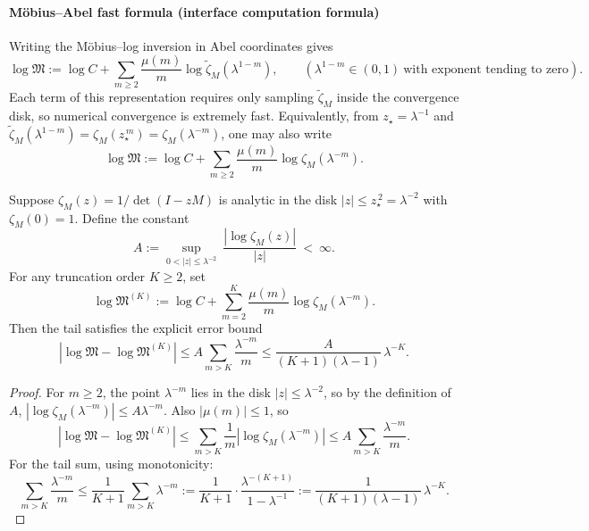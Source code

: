 \paragraph{M\"obius--Abel fast formula (interface computation formula)}
Writing the M\"obius--log inversion in Abel coordinates gives
\[
\log\mathfrak{M}
:=\log C+\sum_{m\ge 2}\frac{\mu(m)}{m}\log\widetilde{\zeta}_M(\lambda^{1-m}),
\qquad (\lambda^{1-m}\in(0,1)\ \text{with exponent tending to zero}).
\]
Each term of this representation requires only sampling $\widetilde{\zeta}_M$ inside the convergence disk, so numerical convergence is extremely fast.
Equivalently, from $z_\star=\lambda^{-1}$ and $\widetilde{\zeta}_M(\lambda^{1-m})=\zeta_M(z_\star^{\,m})=\zeta_M(\lambda^{-m})$, one may also write
\[
\log\mathfrak{M}
:=\log C+\sum_{m\ge 2}\frac{\mu(m)}{m}\log\zeta_M(\lambda^{-m}).
\]

\begin{proposition}\label{prop:real-input-40-logM-trunc-bound}
Suppose $\zeta_M(z)=1/\det(I-zM)$ is analytic in the disk $|z|\le z_\star^{\,2}=\lambda^{-2}$ with $\zeta_M(0)=1$. Define the constant
\[
A:=\sup_{0<|z|\le \lambda^{-2}}\ \frac{|\log\zeta_M(z)|}{|z|}\ <\ \infty.
\]
For any truncation order $K\ge 2$, set
\[
\log\mathfrak{M}^{(K)}:=\log C+\sum_{m=2}^{K}\frac{\mu(m)}{m}\log\zeta_M(\lambda^{-m}).
\]
Then the tail satisfies the explicit error bound
\[
\boxed{\;
|\log\mathfrak{M}-\log\mathfrak{M}^{(K)}|
\le
A\sum_{m>K}\frac{\lambda^{-m}}{m}
\le
\frac{A}{(K+1)(\lambda-1)}\,\lambda^{-K}.
\;}
\]
\end{proposition}
\begin{proof}
For $m\ge 2$, the point $\lambda^{-m}$ lies in the disk $|z|\le\lambda^{-2}$, so by the definition of $A$,
\(
|\log\zeta_M(\lambda^{-m})|\le A\lambda^{-m}
\).
Also $|\mu(m)|\le 1$, so
\[
|\log\mathfrak{M}-\log\mathfrak{M}^{(K)}|
\le \sum_{m>K}\frac{1}{m}|\log\zeta_M(\lambda^{-m})|
\le A\sum_{m>K}\frac{\lambda^{-m}}{m}.
\]
For the tail sum, using monotonicity:
\[
\sum_{m>K}\frac{\lambda^{-m}}{m}
\le
\frac{1}{K+1}\sum_{m>K}\lambda^{-m}
:=\frac{1}{K+1}\cdot\frac{\lambda^{-(K+1)}}{1-\lambda^{-1}}
:=\frac{1}{(K+1)(\lambda-1)}\,\lambda^{-K}.
\]
\end{proof}

